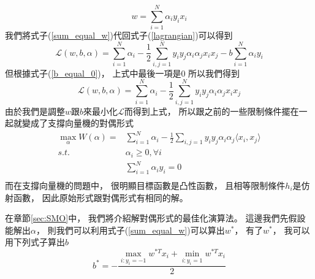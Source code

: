   \begin{equation}
    w = \sum_{i=1}^N \alpha_i y_i x_i \label{sum_equal_w} 
  \end{equation}
  我們將式子(\ref{sum_equal_w})代回式子(\ref{lagrangian})可以得到
  \begin{equation}
    \mathcal{L}(w, b, \alpha) = \sum_{i=1}^N \alpha_i - \frac{1}{2} \sum_{i, j=1}^N y_i y_j \alpha_i \alpha_j x_i x_j - b \sum_{i=1}^N \alpha_i y_i   
  \end{equation}
  但根據式子(\ref{b_equal_0})，
  上式中最後一項是0
  所以我們得到
  \begin{equation}
    \mathcal{L}(w, b, \alpha) = \sum_{i=1}^N \alpha_i - \frac{1}{2} \sum_{i, j=1}^N y_i y_j \alpha_i \alpha_j x_i x_j    
  \end{equation}
  由於我們是調整$w$跟$b$來最小化$\mathcal{L}$而得到上式，
  所以跟之前的一些限制條件擺在一起就變成了支撐向量機的對偶形式
  \begin{equation}
    \begin{split}
    \max_{\alpha} W(\alpha) = &\sum_{i=1}^N \alpha_i - \frac{1}{2} \sum_{i, j=1} y_i y_j \alpha_i \alpha_j \langle x_i, x_j \rangle \\
      s.t. &\alpha_i \geq 0, \forall i \\
      &\sum_{i=1}^N \alpha_i y_i = 0 \\
    \end{split}
  \end{equation}
  而在支撐向量機的問題中，
  很明顯目標函數是凸性函數，
  且相等限制條件$h_i$是仿射函數，
  因此原始形式跟對偶形式有相同的解。
 
  在章節\ref{sec:SMO}中，
  我們將介紹解對偶形式的最佳化演算法。
  這邊我們先假設能解出$\alpha$，
  則我們可以利用式子(\ref{sum_equal_w})可以算出$w^{*}$，
  有了$w^{*}$，
  我可以用下列式子算出$b$
  \begin{equation}
    b^{*} = - \frac{ \max_{i:y_i = -1} w^{*T} x_i + \min_{i: y_i = 1} w^{*T} x_i }{ 2 }
  \end{equation}

